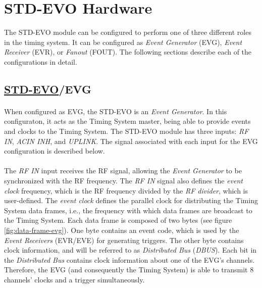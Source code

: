 \documentclass[openany]{article}
\begin{document}
\FloatBarrier
\section{STD-EVO Hardware}\label{sec:evo-hardware}

\par The STD-EVO module can be configured to perform one of three different roles in the timing system. It can be configured as \emph{Event Generator} (EVG), \emph{Event Receiver} (EVR), or \emph{Fanout} (FOUT). The following sections describe each of the configurations in detail.

\etoclocalframed[1]{}

	\subsection{\hyperref[sec:evo-hardware]{STD-EVO}/EVG}

	\paragraph{} When configured as EVG, the STD-EVO is an \emph{Event Generator}. In this configuraton, it acts as the Timing System master, being able to provide events and clocks to the Timing System. The STD-EVO module has three inputs: \emph{RF IN}, \emph{ACIN INH}, and \emph{UPLINK}. The signal associated with each input for the EVG configuration is described below.
	\paragraph{} The \emph{RF IN} input receives the RF signal, allowing the \emph{Event Generator} to be synchronized with the RF frequency. The \emph{RF IN} signal also defines the \emph{event clock} frequency, which is the RF frequency divided by the \emph{RF divider}, which is user-defined. The \emph{event clock} defines the parallel clock for distributing the Timing System data frames, i.e., the frequency with which data frames are broadcast to the Timing System. Each data frame is composed of two bytes (see figure \ref{fig:data-frame-evg}). One byte contains an event code, which is used by the \emph{Event Receivers} (EVR/EVE) for generating triggers. The other byte contains clock information, and will be referred to as \emph{Distributed Bus} (\emph{DBUS}). Each bit in the \emph{Distributed Bus} contains clock information about one of the EVG's channels. Therefore, the EVG (and consequently the Timing System) is able to transmit 8 channels' clocks and a trigger simultaneously.
\end{document}
